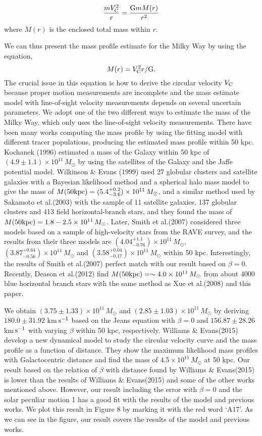 \documentclass[12pt,preprint]{aastex}
\begin{document}
\begin{equation}
\frac{m V^2_{\rm C}}{r} = \frac{{\rm G}mM(r)}{r^2}
\end{equation}
where $M(r)$ is the enclosed total mass within $r$.

We can thus present the mass profile estimate for the Milky Way by using the equation,
\begin{equation}
M(r) = {V^2_{\rm C} r}/{\rm G}.
\end{equation}
The crucial issue in this equation is how to derive the circular velocity $V_{\rm C}$ because proper motion measurements are incomplete and the mass estimate model with line-of-sight velocity measurements depends on several uncertain parameters. We adopt one of the two different ways to estimate the mass of the Milky Way, which only uses the line-of-sight velocity measurements. There have been many works computing the mass profile by using the fitting model with different tracer populations, producing the estimated mass profile within 50 kpc. Kochanek (1996) estimated a mass of the Galaxy within 50 kpc of $(4.9\pm1.1)\times10^{11}\,M_\odot$ by using the satellites of the Galaxy and the Jaffe potential model. Wilkinson \& Evans (1999) used 27 globular clusters and satellite galaxies with a Bayesian likelihood method and a spherical halo mass model to give the mass of $M(50 {\rm kpc}) = (5.4^{+0.2}_{-3.6})\times10^{11}\,M_\odot$, and a similar method used by Sakamoto et al.(2003) with the sample of 11 satellite galaxies, 137 globular clusters and 413 field horizontal-branch stars,  and they found the mass of $M(50 {\rm kpc}) = 1.8-2.5\times10^{11}\,M_\odot$. Later, Smith et al.(2007) considered three models based on a
sample of high-velocity stars from the RAVE survey, and the results from their three models are $(4.04^{+1.1}_{-0.76})\times10^{11}\,M_\odot$, $(3.87^{+0.64}_{-0.56})\times10^{11}\,M_\odot$ and $(3.58^{+0.04}_{-0.17})\times10^{11}\,M_\odot$ within 50 kpc. Interestingly, the results of Smith et al.(2007) perfect match with our result based on $\beta = 0$. Recently, Deason et al.(2012) find $M(50 {\rm kpc}) = \sim 4.0\times10^{11}\,M_\odot$ from about 4000 blue horizontal branch stars with the same method as Xue et al.(2008) and this paper.

We obtain $(3.75\pm1.33)\times10^{11}\,M_\odot$ and $(2.85\pm1.03)\times10^{11}\,M_\odot$ by deriving $180.0\pm31.92$ km$\,\rm s^{-1}$ based on the Jeans equation with $\beta = 0$ and $156.87\pm28.26$ km$\,\rm s^{-1}$ with varying $\beta$ within 50 kpc, respectively. Williams \& Evans(2015) develop a new dynamical model to study the circular velocity curve and the mass profile as a function of distance. They show the maximum likelihood mass profiles with Galactocentric distance and find the mass of $4.5\times10^{11}\,M_\odot$ at 50 kpc. Our result based on the relation of $\beta$ with distance found by Williams \& Evans(2015) is lower than the results of Williams \& Evans(2015) and some of the other works mentioned above. However, our result including the error with $\beta = 0$ and the solar peculiar motion 1 has a good fit with the results of the model and previous works. We plot this result in Figure 8 by marking it with the red word `A17'. As we can see in the figure, our result covers the results of the model and previous works.
\end{document}
